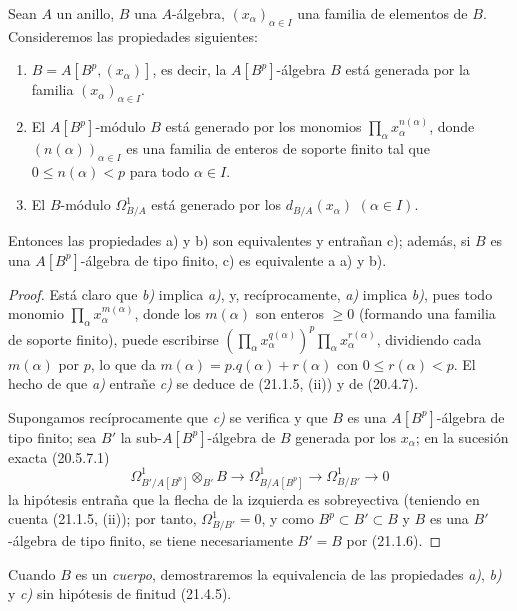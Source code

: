 \begin{proposition}[21.1.7]
\label{0.21.1.7-fr}
Sean $A$ un anillo, $B$ una $A$-álgebra, $(x_\alpha)_{\alpha\in I}$ una
familia de elementos de $B$. Consideremos las propiedades siguientes:
\begin{enumerate}
  \item[\textup{a)}] $B=A[B^p,(x_\alpha)]$, es decir, la $A[B^p]$-álgebra $B$ está
  generada por la familia $(x_\alpha)_{\alpha\in I}$.
  \item[\textup{b)}] El $A[B^p]$-módulo $B$ está generado por los monomios
  $\prod_\alpha x_\alpha^{n(\alpha)}$, donde $(n(\alpha))_{\alpha\in I}$ es
  una familia de enteros de soporte finito tal que $0\leq n(\alpha)<p$ para
  todo $\alpha\in I$.
  \item[\textup{c)}] El $B$-módulo $\Omega^1_{B/A}$ está generado por los
  $d_{B/A}(x_\alpha)$ $(\alpha\in I)$.
\end{enumerate}
Entonces las propiedades \textup{a)} y \textup{b)} son equivalentes y entrañan \textup{c)}; además, si
$B$ es una $A[B^p]$-álgebra de tipo finito, \textup{c)} es equivalente a \textup{a)} y \textup{b)}.
\end{proposition}

\begin{proof}
Está claro que \emph{b)} implica \emph{a)}, y, recíprocamente, \emph{a)} implica \emph{b)}, pues todo
monomio $\prod_\alpha x_\alpha^{m(\alpha)}$, donde los $m(\alpha)$ son
enteros $\geq0$ (formando una familia de soporte finito), puede escribirse
$(\prod_\alpha x_\alpha^{q(\alpha)})^p\prod_\alpha x_\alpha^{r(\alpha)}$,
dividiendo cada $m(\alpha)$ por $p$, lo que da
$m(\alpha)=p.q(\alpha)+r(\alpha)$ con $0\leq r(\alpha)<p$.
El hecho de que \emph{a)} entrañe \emph{c)} se deduce de (21.1.5, (ii)) y de (20.4.7).

Supongamos recíprocamente que \emph{c)} se verifica y que $B$ es una
$A[B^p]$-álgebra de tipo finito; sea $B'$ la sub-$A[B^p]$-álgebra de $B$
generada por los $x_\alpha$; en la sucesión exacta (20.5.7.1)
\[
\Omega^1_{B'/A[B^p]}\otimes_{B'}B\longrightarrow
\Omega^1_{B/A[B^p]}\longrightarrow\Omega^1_{B/B'}\longrightarrow0
\]
la hipótesis entraña que la flecha de la izquierda es sobreyectiva (teniendo
en cuenta (21.1.5, (ii)); por tanto, $\Omega^1_{B/B'}=0$, y como
$B^p\subset B'\subset B$ y $B$ es una $B'$-álgebra de tipo finito, se tiene
necesariamente $B'=B$ por (21.1.6).
\end{proof}

\begin{remark}[21.1.8]
\label{0.21.1.8-fr}
Cuando $B$ es un \emph{cuerpo}, demostraremos la equivalencia de las propiedades \emph{a)},
\emph{b)} y \emph{c)} sin hipótesis de finitud (21.4.5).
\end{remark}

